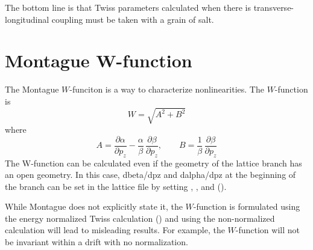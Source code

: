 The bottom line is that Twiss parameters calculated when there is transverse-longitudinal coupling
must be taken with a grain of salt. 

\section{Montague W-function}
\label{s:w.func}

The Montague $W$-funciton\cite{b:montague} is a way to characterize nonlinearities. The $W$-function
is 
\begin{equation}
  W = \sqrt{A^2 + B^2}
\end{equation}
where
\begin{equation}
  A = \frac{\partial\alpha}{\partial p_z} - \frac{\alpha}{\beta} \, \frac{\partial\beta}{\partial p_z},
  \qquad
  B = \frac{1}{\beta} \, \frac{\partial\beta}{\partial p_z}
\end{equation}
The W-function can be calculated even if the geometry of the lattice branch has
an open geometry.  In this case, dbeta/dpz and dalpha/dpz at the beginning of the branch can be set
in the lattice file by setting , ,
 and  ().

While Montague does not explicitly state it, the $W$-function is formulated using the energy
normalized Twiss calculation () and using the non-normalized calculation will lead
to misleading results. For example, the $W$-function will not be invariant within a drift with no
normalization.
